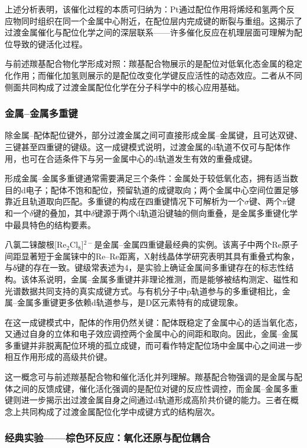 \documentclass[UTF8]{ctexbook}
\begin{document}
上述分析表明，该催化过程的本质可归纳为：Pt通过配位作用将烯烃和氢两个反应物同时组织在同一个金属中心附近，在配位层内完成键的断裂与重组。这揭示了过渡金属催化与配位化学之间的深层联系——许多催化反应在机理层面可理解为配位导致的键活化过程。

与前述羰基配合物化学形成对照：羰基配合物展示的是配位对低氧化态金属的稳定化作用；而催化加氢则展示的是配位改变化学键反应活性的动态效应。二者从不同侧面共同构成了过渡金属配位化学在分子科学中的核心应用基础。

\subsubsection{金属--金属多重键}

除金属--配体配位键外，部分过渡金属之间可直接形成金属--金属键，且可达双键、三键甚至四重键的键级。这一成键模式说明，过渡金属的d轨道不仅可与配体作用，也可在合适条件下与另一金属中心的d轨道发生有效的重叠成键。

形成金属--金属多重键通常需要满足三个条件：金属处于较低氧化态，拥有适当数目的d电子；配体不饱和配位，预留轨道的成键取向；两个金属中心空间位置足够靠近且轨道取向匹配。多重键的构成在四重键情况下可解析为一个$\sigma$键、两个$\pi$键和一个$\delta$键的叠加，其中$\delta$键源于两个d轨道沿键轴的侧向重叠，是金属多重键化学中最具特色的结构要素。

八氯二铼酸根[Re$_2$Cl$_8$]$^{2-}$是金属--金属四重键最经典的实例。该离子中两个Re原子间距显著短于金属铼中的Re--Re距离，X射线晶体学研究表明其具有重叠式构象，与δ键的存在一致。键级常表述为4，是实验上确证金属间多重键存在的标志性结构。该体系说明，金属--金属多重键并非理论推测，而是能够被结构测定、磁性和光谱数据共同支持的真实成键方式。与有机分子中p轨道参与的多重键相比，金属--金属多重键更多依赖d轨道参与，是D区元素特有的成键现象。

在这一成键模式中，配体的作用仍然关键：配体既稳定了金属中心的适当氧化态，又通过自身的立体和电子效应调控两个金属中心的间距和取向。因此，金属--金属多重键并非脱离配位环境的孤立成键，而可看作特定配位场中金属中心之间进一步相互作用形成的高级共价键。

这一概念可与前述羰基配合物和催化活化并列理解。羰基配合物强调的是金属与配体之间的反馈成键，催化活化强调的是配位对键的反应性调控，而金属--金属多重键则进一步揭示出过渡金属自身之间通过d轨道形成高阶共价键的能力。三者在概念上共同构成了过渡金属配位化学中成键方式的结构层次。

\subsubsection{经典实验——棕色环反应：氧化还原与配位耦合}
\end{document}
